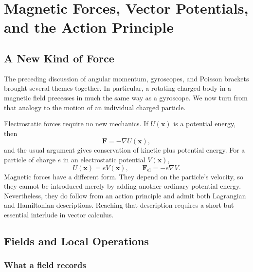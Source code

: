 \chapter{Magnetic Forces, Vector Potentials, and the Action Principle}


\section{A New Kind of Force}

The preceding discussion of angular momentum, gyroscopes, and Poisson brackets brought several themes together. In particular, a rotating charged body in a magnetic field precesses in much the same way as a gyroscope. We now turn from that analogy to the motion of an individual charged particle.

Electrostatic forces require no new mechanics. If \(U(\mathbf x)\) is a potential energy, then
\begin{equation}
  \mathbf F=-\nabla U(\mathbf x),
\end{equation}
and the usual argument gives conservation of kinetic plus potential energy. For a particle of charge \(e\) in an electrostatic potential \(V(\mathbf x)\),
\begin{equation}
  U(\mathbf x)=eV(\mathbf x),
  \qquad
  \mathbf F_{\mathrm{el}}=-e\nabla V.
\end{equation}
Magnetic forces have a different form. They depend on the particle's velocity, so they cannot be introduced merely by adding another ordinary potential energy. Nevertheless, they do follow from an action principle and admit both Lagrangian and Hamiltonian descriptions. Reaching that description requires a short but essential interlude in vector calculus.

\section{Fields and Local Operations}

\subsection{What a field records}

